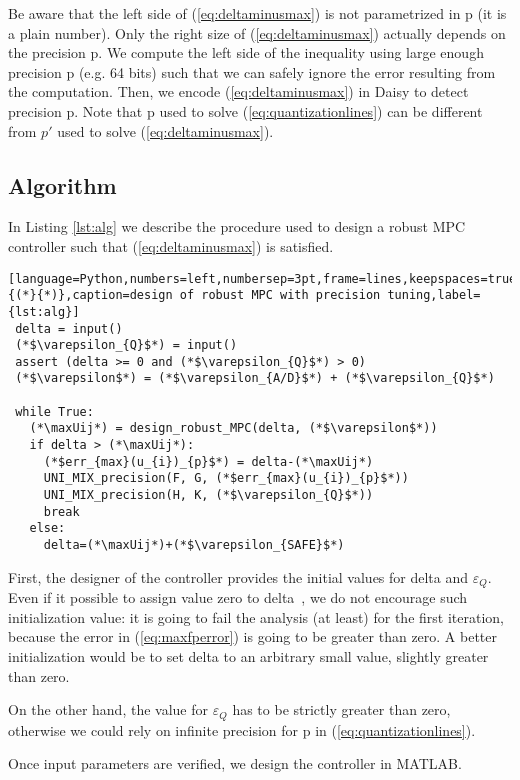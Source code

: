 Be aware that the left side of (\ref{eq:deltaminusmax}) is not parametrized in p (it is a plain number). Only the right size of (\ref{eq:deltaminusmax}) actually depends on the precision p. We compute the left side of the inequality using large enough precision p (e.g. 64 bits) such that we can safely ignore the error resulting from the computation.
Then, we encode (\ref{eq:deltaminusmax}) in Daisy to detect precision p. Note that p used to solve (\ref{eq:quantizationlines}) can be different from $p'$ used to solve (\ref{eq:deltaminusmax}).

\subsection{Algorithm}
In Listing \ref{lst:alg} we describe the procedure used to design a robust MPC controller such that (\ref{eq:deltaminusmax}) is satisfied.

\begin{lstlisting}[language=Python,numbers=left,numbersep=3pt,frame=lines,keepspaces=true,escapeinside={(*}{*)},caption=design of robust MPC with precision tuning,label={lst:alg}]
 delta = input()
 (*$\varepsilon_{Q}$*) = input()
 assert (delta >= 0 and (*$\varepsilon_{Q}$*) > 0)
 (*$\varepsilon$*) = (*$\varepsilon_{A/D}$*) + (*$\varepsilon_{Q}$*)

 while True:
   (*\maxUij*) = design_robust_MPC(delta, (*$\varepsilon$*))
   if delta > (*\maxUij*):
     (*$err_{max}(u_{i})_{p}$*) = delta-(*\maxUij*)
     UNI_MIX_precision(F, G, (*$err_{max}(u_{i})_{p}$*))
     UNI_MIX_precision(H, K, (*$\varepsilon_{Q}$*))
     break
   else:
     delta=(*\maxUij*)+(*$\varepsilon_{SAFE}$*)
\end{lstlisting}

First, the designer of the controller provides the initial values for delta and $\varepsilon_{Q}$. Even if it possible to assign value zero to delta~\cite{imperialrmpc}, we do not encourage such initialization value: it is going to fail the analysis (at least) for the first iteration, because the error in (\ref{eq:maxfperror}) is going to be greater than zero. A better initialization would be to set delta to an arbitrary small value, slightly greater than zero.

On the other hand, the value for $\varepsilon_{Q}$ has to be strictly greater than zero, otherwise we could rely on infinite precision for p in (\ref{eq:quantizationlines}).

Once input parameters are verified, we design the controller in MATLAB. 


